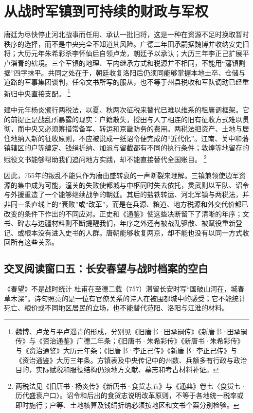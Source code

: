 \section{从战时军镇到可持续的财政与军权}

唐廷为尽快停止河北战事而任用、承认一批旧将，这是一种在资源不足时换取暂时秩序的选择，而不是中央完全不知道其风险。广德二年田承嗣据魏博并收纳安史旧将；大历元年朱希彩杀李怀仙后自领卢龙，朝廷予以承认；大历三年李正己扩展平卢淄青的辖境。三个军镇的地理、军内继承方式和税源并不相同，不能用“藩镇割据”四字抹平。共同之处在于，朝廷收复洛阳后仍须同能够掌握本地士卒、仓储与道路的军事集团谈判，任命文书所写的服从，也不等于州县税收和军队调动已经重新归中央直接支配。%
\footnote{魏博、卢龙与平卢淄青的形成，分别见《旧唐书·田承嗣传》《新唐书·田承嗣传》与《资治通鉴》广德二年条；《旧唐书·朱希彩传》《新唐书·朱希彩传》与《资治通鉴》大历元年条；《旧唐书·李正己传》《新唐书·李正己传》与《资治通鉴》大历三年条。方镇表及中央传记中的州数、兵额多有行政与政治目的，实际赋税和服役结构仍须地方文献、墓志和考古材料补证。}

建中元年杨炎颁行两税法，以夏、秋两次征税来替代已难以维系的租庸调框架。它的前提正是战乱所暴露的现实：户籍散失，授田与人丁相连的旧有征收方式难以贯彻，而中央又必须筹措常备军、转运和京畿防务的费用。两税法把资产、土地与居住地纳入新的征收原则，不应被说成一纸诏令便完成的“近代化”。江南、关中和藩镇辖区的户等编定、钱绢折纳、加派与留截都有不同的执行条件；敦煌等地留存的赋役文书能够帮助我们追问地方实践，却不能直接替代全国账目。%
\footnote{两税法见《旧唐书·杨炎传》《新唐书·食货志五》与《通典》卷七〈食货七·历代盛衰户口〉。诏令和后出的食货志说明改革原则，不等于各地统一税率或即时施行；户等、土地核算及钱绢折纳必须按地区和文书个案分别检验。}

因此，755年的叛乱不能只作为唐由盛转衰的一声断裂来理解。三镇兼领使边军资源的集中成为可能，潼关的失败使都城与中枢同时失去依托，灵武则以军队、诏令与外援重造了一个能够继续战争的朝廷。其后的盐铁转运、河北军镇与两税法，并非同一条直线上的“衰败”或“改革”，而是在兵源、粮道、地方税源和外交代价都已改变的条件下作出的不同应对。正史和《通鉴》使这些决断留下了清晰的年序；文书、碑志与边疆材料则不断提醒我们，年序之外还有被战乱驱散、被赋役重新登记、或根本没有进入史书的人群。唐朝能够收复两京，却不能也没有以同一方式收回所有这些关系。

\subsection{交叉阅读窗口五：长安春望与战时档案的空白}

\begin{textwindow}{《春望》不是战时统计}
杜甫在至德二载（757）滞留长安时写“国破山河在，城春草木深”。诗句照亮的是一位有官僚关系的诗人在被围都城中的感受；它不能统计死亡、粮价或不同地区居民的立场，也不能替代范阳、洛阳与江淮的材料。
\end{textwindow}


